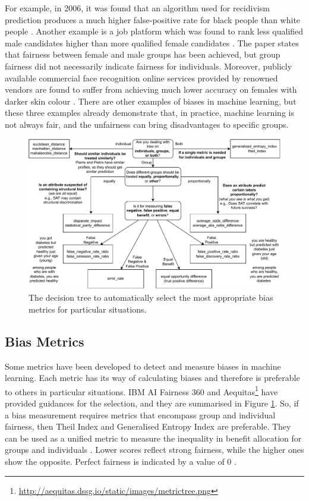 \documentclass[sigconf,review]{acmart}
\begin{document}
	For example, in 2006, it was found that an algorithm used for recidivism prediction produces a much higher false-positive rate for black people than white people \cite{angwin2016machine}. Another example is a job platform which was found to rank less qualified male candidates higher than more qualified female candidates \cite{lahoti2019ifair}. The paper states that fairness between female and male groups has been achieved, but group fairness did not necessarily indicate fairness for individuals. Moreover, publicly available commercial face recognition online services provided by renowned vendors are found to suffer from achieving much lower accuracy on females with darker skin colour \cite{buolamwini2018gender}. There are other examples of biases in machine learning, but these three examples already demonstrate that, in practice, machine learning is not always fair, and the unfairness can bring disadvantages to specific groups. 
	
	\begin{figure}[h]
		\includegraphics[width=\linewidth]{figures/wizard-metric}
		\caption{The decision tree to automatically select the most appropriate bias metrics for particular situations.}
		\label{fig:wizard-metric}
	\end{figure}

	\subsection{Bias Metrics}
	\label{sec:bias_metrics}	
	Some metrics have been developed to detect and measure biases in machine learning. Each metric has its way of calculating biases and therefore is preferable to others in particular situations. IBM AI Fairness 360 \cite{mahoney2020ai,ibmaif3602022guidance} and Aequitas\footnote{\url{http://aequitas.dssg.io/static/images/metrictree.png}} have provided guidances for the selection, and they are summarised in Figure \ref{fig:wizard-metric}. So, if a bias measurement requires metrics that encompass group and individual fairness, then Theil Index \cite{conceicao2000theyoung,bellamy2018ai} and Generalised Entropy Index \cite{speicher2018unified} are preferable. They can be used as a unified metric to measure the inequality in benefit allocation for groups and individuals \cite{ibmaif3602022guidance,mahoney2020ai}. Lower scores reflect strong fairness, while the higher ones show the opposite. Perfect fairness is indicated by a value of 0 \cite{lale2022doc}. 
	
\end{document}
